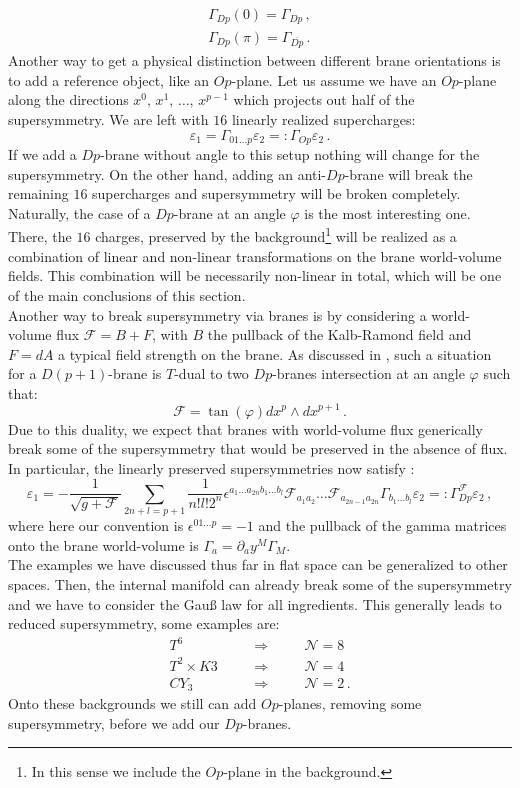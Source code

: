 \documentclass[a4paper,12pt]{report}
\newcommand{\be}{\begin{equation}}
\newcommand{\ee}{\end{equation}}
\newcommand{\bea}{\begin{equation}\begin{aligned}}
\newcommand{\eea}{\end{aligned}\end{equation}}
\begin{document}
\bea
\Gamma_{Dp} (0) = \Gamma_{Dp}\,,\\
\Gamma_{Dp} (\pi) = \Gamma_{\overline{Dp}}\,.
\eea
Another way to get a physical distinction between different brane orientations is to add a reference object, like an $Op$-plane. Let us assume we have an $Op$-plane along the directions $x^0,\,x^1,\,\ldots ,\, x^{p-1}$ which projects out half of the supersymmetry. We are left with $16$ linearly realized supercharges:
\be 
\varepsilon_1 = \Gamma_{01\ldots p} \varepsilon_2 =: \Gamma_{Op}\varepsilon_2\,.
\ee
If we add a $Dp$-brane without angle to this setup nothing will change for the supersymmetry. On the other hand, adding an anti-$Dp$-brane will break the remaining $16$ supercharges and supersymmetry will be broken completely. Naturally, the case of a $Dp$-brane at an angle $\varphi$ is the most interesting one. There, the $16$ charges, preserved by the background\footnote{In this sense we include the $Op$-plane in the background.} will be realized as a combination of linear and non-linear transformations on the brane world-volume fields. This combination will be necessarily non-linear in total, which will be one of the main conclusions of this section.\\
Another way to break supersymmetry via branes is by considering a world-volume flux $\mathcal{F}=B+F$, with $B$ the pullback of the Kalb-Ramond field and $F=dA$ a typical field strength on the brane. As discussed in \cite{Johnson:2003glb}, such a situation for a $D(p+1)$-brane is $T$-dual to two $Dp$-branes intersection at an angle $\varphi$ such that:
\be 
\mathcal{F} = \tan (\varphi) dx^p \wedge dx^{p+1}\,.
\ee
Due to this duality, we expect that branes with world-volume flux generically break some of the supersymmetry that would be preserved in the absence of flux. In particular, the linearly preserved supersymmetries now satisfy \cite{Koerber:2010bx}:
\be 
\varepsilon_1 = - \frac{1}{\sqrt{g+\mathcal{F}}} \sum_{2n+l=p+1} \frac{1}{n!l!2^n} \epsilon^{a_1\dots a_{2n}b_1 \ldots b_l} \mathcal{F}_{a_1 a_2 } \ldots \mathcal{F}_{a_{2n-1}a_{2n}} \Gamma_{b_1 \ldots b_l} \varepsilon_2 =: \Gamma_{Dp}^{\mathcal{F}}\varepsilon_2\,,
\ee
where here our convention is $\epsilon^{01\dots p} = -1$ and the pullback of the gamma matrices onto the brane world-volume is $\Gamma_a = \partial_a y^M \Gamma_M$.\\
The examples we have discussed thus far in flat space can be generalized to other spaces. Then, the internal manifold can already break some of the supersymmetry and we have to consider the Gauß law for all ingredients. This generally leads to reduced supersymmetry, some examples are:
\be 
\begin{matrix}
     T^6 &\quad&\Rightarrow&\quad& \mathcal{N}=8\,\\
     T^2 \times K3 &\quad&\Rightarrow&\quad& \mathcal{N}=4\,\\
     CY_3 &\quad&\Rightarrow&\quad& \mathcal{N}=2\,.
\end{matrix}
\ee
Onto these backgrounds we still can add $Op$-planes, removing some supersymmetry, before we add our $Dp$-branes. 
\end{document}
